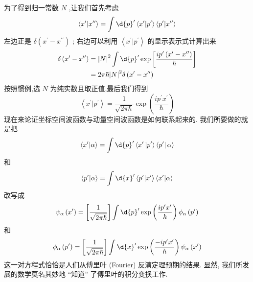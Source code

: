 \documentclass[lang=cn,newtx,10pt,scheme=chinese,thmcnt=section]{elegantbook}
\begin{document}
为了得到归一常数 $N$ ,让我们首先考虑
\begin{equation}
	\left\langle {{x}^{\prime } | {x}^{\prime \prime }}\right\rangle = \int \d{p}^{\prime }\left\langle {{x}^{\prime } | {p}^{\prime }}\right\rangle \left\langle {{p}^{\prime } | {x}^{\prime \prime }}\right\rangle
\end{equation}
左边正是 $\delta \left( {{x}^{\prime } - {x}^{\prime \prime }}\right)$ ; 右边可以利用 $\left\langle {{x}^{\prime } | {p}^{\prime }}\right\rangle$ 的显示表示式计算出来
\begin{equation}
	\begin{aligned}
		\delta \left( {{x}^{\prime } - {x}^{\prime \prime }}\right) &= {\left| N\right| }^{2}\int \d{p}^{\prime }\exp \left\lbrack \frac{i{p}^{\prime }\left( {{x}^{\prime } - {x}^{\prime \prime }}\right) }{\hbar }\right\rbrack\\
		&= {2\pi }\hbar {\left| N\right| }^{2}\delta \left( {{x}^{\prime } - {x}^{\prime \prime }}\right)
	\end{aligned}
\end{equation}
按照惯例,选 $N$ 为纯实数且取正值,最后我们得到
\begin{equation}
	\left\langle {{x}^{\prime } | {p}^{\prime }}\right\rangle = \frac{1}{\sqrt{{2\pi }\hbar }}\exp \left( \frac{i{p}^{\prime }{x}^{\prime }}{\hbar }\right)
\end{equation}
现在来论证坐标空间波函数与动量空间波函数是如何联系起来的. 我们所要做的就是把
\begin{equation}
	\left\langle {{x}^{\prime } | \alpha }\right\rangle = \int \d{p}^{\prime }\left\langle {{x}^{\prime }\left| {p}^{\prime }\right\rangle \left\langle {p}^{\prime }\right| \alpha }\right\rangle
\end{equation}
和
\begin{equation}
	\left\langle {{p}^{\prime } | \alpha }\right\rangle = \int \d{x}^{\prime }\left\langle {{p}^{\prime } | {x}^{\prime }}\right\rangle \left\langle {{x}^{\prime } | \alpha }\right\rangle
\end{equation}
改写成
\begin{equation}
	{\psi }_{\alpha }\left( {x}^{\prime }\right) = \left\lbrack \frac{1}{\sqrt{{2\pi }\hbar }}\right\rbrack \int \d{p}^{\prime }\exp \left( \frac{i{p}^{\prime }{x}^{\prime }}{\hbar }\right) {\phi }_{\alpha }\left( {p}^{\prime }\right)
\end{equation}
和
\begin{equation}
	{\phi }_{\alpha }\left( {p}^{\prime }\right) = \left\lbrack \frac{1}{\sqrt{{2\pi }\hbar }}\right\rbrack \int \d{x}^{\prime }\exp \left( \frac{-i{p}^{\prime }{x}^{\prime }}{\hbar }\right) {\psi }_{\alpha }\left( {x}^{\prime }\right)
\end{equation}
这一对方程式恰恰是人们从傅里叶 (Fourier) 反演定理预期的结果. 显然, 我们所发展的数学莫名其妙地 “知道” 了傅里叶的积分变换工作.
\end{document}
